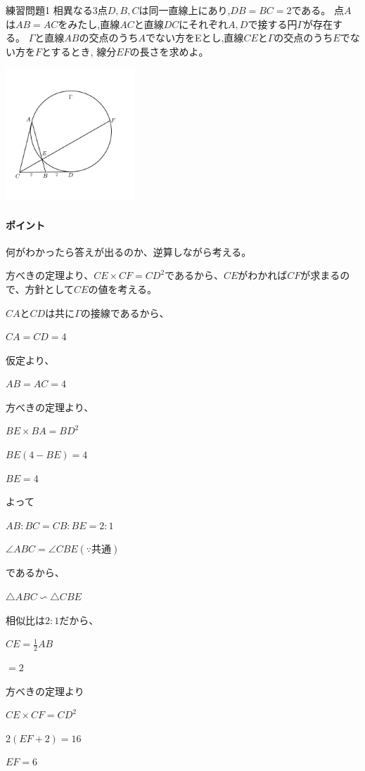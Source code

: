 \documentclass[uplatex,fleqn]{jsbook}
\begin{document}
\begin{problem}{練習問題1}
    相異なる3点$D,B,C$は同一直線上にあり,$DB=BC=2$である。
    点$A$は$AB=AC$をみたし,直線$AC$と直線$DC$にそれぞれ$A,D$で接する円$\Gamma$が存在する。
    $\Gamma$と直線$AB$の交点のうち$A$でない方をEとし,直線$CE$と$\Gamma$の交点のうち$E$でない方を$F$とするとき,
    線分$EF$の長さを求めよ。

    \includegraphics[clip,height=5cm]{figures/practice1.pdf}

\end{problem}

\paragraph{ポイント} 何がわかったら答えが出るのか、逆算しながら考える。

\begin{answer}
    方べきの定理より、$CE\times CF=CD^2$であるから、$CE$がわかれば$CF$が求まるので、方針として$CE$の値を考える。

    $CA$と$CD$は共に$\Gamma$の接線であるから、

    $CA=CD=4$

    仮定より、

    $AB=AC=4$

    方べきの定理より、

    $BE\times BA=BD^2$

    $BE(4-BE)=4$

    $BE=4$

    よって

    $AB:BC=CB:BE=2:1$

    $\angle ABC = \angle CBE(\because 共通)$

    であるから、

    $\triangle ABC ∽ \triangle CBE$

    相似比は$2:1$だから、

    $\displaystyle CE=\frac{1}{2}AB$

    $=2$

    方べきの定理より

    $CE\times CF = CD^2$

    $2(EF+2)=16$

    $EF=6$
\end{answer}
\end{document}
